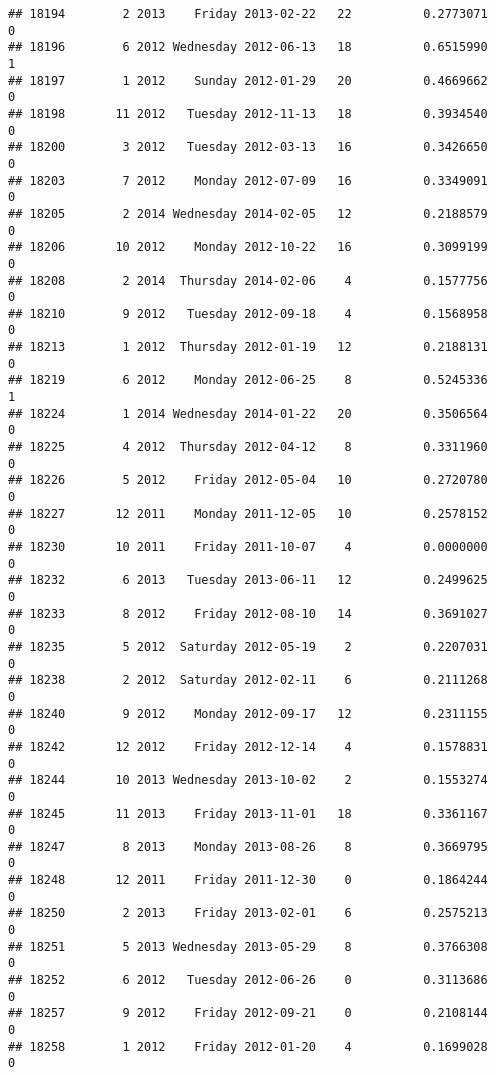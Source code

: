 \documentclass[
]{article}
\begin{document}
\begin{verbatim}
## 18194        2 2013    Friday 2013-02-22   22          0.2773071             0
## 18196        6 2012 Wednesday 2012-06-13   18          0.6515990             1
## 18197        1 2012    Sunday 2012-01-29   20          0.4669662             0
## 18198       11 2012   Tuesday 2012-11-13   18          0.3934540             0
## 18200        3 2012   Tuesday 2012-03-13   16          0.3426650             0
## 18203        7 2012    Monday 2012-07-09   16          0.3349091             0
## 18205        2 2014 Wednesday 2014-02-05   12          0.2188579             0
## 18206       10 2012    Monday 2012-10-22   16          0.3099199             0
## 18208        2 2014  Thursday 2014-02-06    4          0.1577756             0
## 18210        9 2012   Tuesday 2012-09-18    4          0.1568958             0
## 18213        1 2012  Thursday 2012-01-19   12          0.2188131             0
## 18219        6 2012    Monday 2012-06-25    8          0.5245336             1
## 18224        1 2014 Wednesday 2014-01-22   20          0.3506564             0
## 18225        4 2012  Thursday 2012-04-12    8          0.3311960             0
## 18226        5 2012    Friday 2012-05-04   10          0.2720780             0
## 18227       12 2011    Monday 2011-12-05   10          0.2578152             0
## 18230       10 2011    Friday 2011-10-07    4          0.0000000             0
## 18232        6 2013   Tuesday 2013-06-11   12          0.2499625             0
## 18233        8 2012    Friday 2012-08-10   14          0.3691027             0
## 18235        5 2012  Saturday 2012-05-19    2          0.2207031             0
## 18238        2 2012  Saturday 2012-02-11    6          0.2111268             0
## 18240        9 2012    Monday 2012-09-17   12          0.2311155             0
## 18242       12 2012    Friday 2012-12-14    4          0.1578831             0
## 18244       10 2013 Wednesday 2013-10-02    2          0.1553274             0
## 18245       11 2013    Friday 2013-11-01   18          0.3361167             0
## 18247        8 2013    Monday 2013-08-26    8          0.3669795             0
## 18248       12 2011    Friday 2011-12-30    0          0.1864244             0
## 18250        2 2013    Friday 2013-02-01    6          0.2575213             0
## 18251        5 2013 Wednesday 2013-05-29    8          0.3766308             0
## 18252        6 2012   Tuesday 2012-06-26    0          0.3113686             0
## 18257        9 2012    Friday 2012-09-21    0          0.2108144             0
## 18258        1 2012    Friday 2012-01-20    4          0.1699028             0

\end{verbatim}
\end{document}

